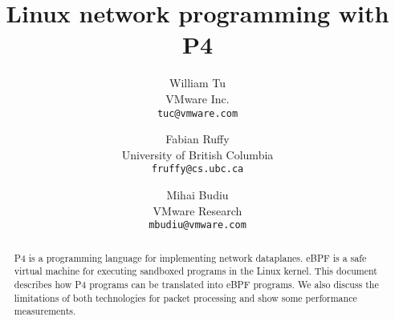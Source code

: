 \documentclass[9pt,twocolumn,times]{article}
\title{Linux network programming with P4}
\author{William Tu\\
  VMware Inc.\\
  \texttt{tuc@vmware.com}
  \and
  Fabian Ruffy\\
  University of British Columbia\\
  \texttt{fruffy@cs.ubc.ca}
  \and
  Mihai Budiu\\
  VMware Research\\
  \texttt{mbudiu@vmware.com}
}
\date{}
\begin{document}
\maketitle

\begin{abstract}
  P4 is a programming language for implementing network dataplanes.
  eBPF is a safe virtual machine for executing sandboxed programs in
  the Linux kernel.  This document describes how P4 programs can be
  translated into eBPF programs.  We also discuss the limitations of
  both technologies for packet processing and show some performance
  measurements.
\end{abstract}










\end{document}
